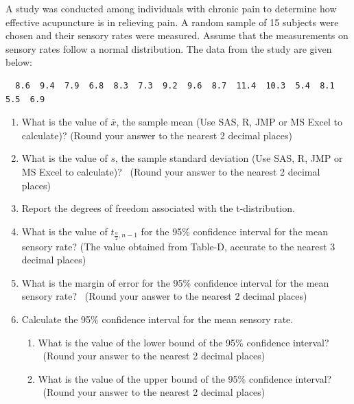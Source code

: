 \item A study was conducted among individuals with chronic pain to determine how effective acupuncture is in relieving pain. A random sample of 15 subjects were chosen and their sensory rates were measured. Assume that the measurements on sensory rates follow a  normal distribution. The data from the study are given below:


\begin{verbatim}
  8.6  9.4  7.9  6.8  8.3  7.3  9.2  9.6  8.7  11.4  10.3  5.4  8.1  5.5  6.9
\end{verbatim}

\begin{enumerate}
      \item What is the value of $\bar{x}$, the sample mean (Use SAS, R, JMP or MS Excel to calculate)?  (Round your answer to the nearest 2 decimal places)  
     \item What is the value of $s$, the sample standard deviation (Use SAS, R, JMP or MS Excel to calculate)? \ (Round your answer to the nearest 2 decimal places)  
     \item Report the degrees of freedom associated with the t-distribution.  
     \item What is the value of $t_{\frac{\alpha}{2},n-1}$ for the 95\% confidence interval for the mean sensory rate? (The value obtained from Table-D, accurate to the nearest 3 decimal places)  
      \item What is the margin of error for the 95\% confidence interval for the mean sensory rate? \ (Round your answer to the nearest 2 decimal places) \\  
      \item Calculate the 95\% confidence interval for the mean sensory rate.
      \begin{enumerate}
      \item What is the value of the lower bound of the 95\% confidence interval? \ (Round your answer to the nearest 2 decimal places) \\  
      \item What is the value of the upper bound of the 95\% confidence interval?  \ (Round your answer to the nearest 2 decimal places) \\  

\end{enumerate}
\end{enumerate}
